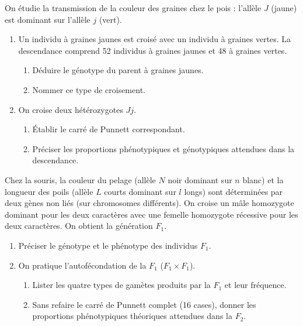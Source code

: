 \documentclass[11pt]{article}
\begin{document}
\begin{exercice}
On étudie la transmission de la couleur des graines chez le pois : l'allèle $J$ (jaune) est dominant sur l'allèle $j$ (vert).
\begin{enumerate}
    \item Un individu à graines jaunes est croisé avec un individu à graines vertes. La descendance comprend 52 individus à graines jaunes et 48 à graines vertes.
    \begin{enumerate}
        \item Déduire le génotype du parent à graines jaunes.
        \item Nommer ce type de croisement.
    \end{enumerate}
    \item On croise deux hétérozygotes $Jj$.
    \begin{enumerate}
        \item Établir le carré de Punnett correspondant.
        \item Préciser les proportions phénotypiques et génotypiques attendues dans la descendance.
    \end{enumerate}
\end{enumerate}
\end{exercice}

\begin{exercice}
Chez la souris, la couleur du pelage (allèle $N$ noir dominant sur $n$ blanc) et la longueur des poils (allèle $L$ courts dominant sur $l$ longs) sont déterminées par deux gènes non liés (sur chromosomes différents).
On croise un mâle homozygote dominant pour les deux caractères avec une femelle homozygote récessive pour les deux caractères. On obtient la génération $F_1$.
\begin{enumerate}
    \item Préciser le génotype et le phénotype des individus $F_1$.
    \item On pratique l'autofécondation de la $F_1$ ($F_1 \times F_1$).
    \begin{enumerate}
        \item Lister les quatre types de gamètes produits par la $F_1$ et leur fréquence.
        \item Sans refaire le carré de Punnett complet (16 cases), donner les proportions phénotypiques théoriques attendues dans la $F_2$.
    \end{enumerate}
\end{enumerate}
\end{exercice}
\end{document}
